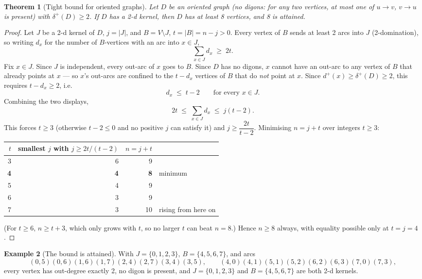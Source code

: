 \documentclass[11pt]{article}
\theoremstyle{plain}
\newtheorem{theorem}{Theorem}
\theoremstyle{definition}
\newtheorem{example}[theorem]{Example}
\theoremstyle{remark}
\begin{document}
\pagestyle{empty}

\begin{theorem}[Tight bound for oriented graphs]
\label{thm:bound}
Let $D$ be an \emph{oriented} graph (no digons: for any two vertices, at most one of
$u\to v$, $v\to u$ is present) with $\delta^+(D) \ge 2$. If $D$ has a 2-d kernel, then
$D$ has at least 8 vertices, and 8 is attained.
\end{theorem}

\begin{proof}
Let $J$ be a 2-d kernel of $D$, $j = |J|$, and $B = V \setminus J$, $t = |B| = n - j > 0$.
Every vertex of $B$ sends at least 2 arcs into $J$ (2-domination), so writing $d_x$
for the number of $B$-vertices with an arc into $x \in J$,
\[
\sum_{x \in J} d_x \;\ge\; 2t.
\]
Fix $x \in J$. Since $J$ is independent, every out-arc of $x$ goes to $B$. Since $D$
has no digons, $x$ cannot have an out-arc to any vertex of $B$ that already points at
$x$ — so $x$'s out-arcs are confined to the $t - d_x$ vertices of $B$ that do
\emph{not} point at $x$. Since $d^+(x) \ge \delta^+(D) \ge 2$, this requires
$t - d_x \ge 2$, i.e.
\[
d_x \;\le\; t-2 \qquad \text{for every } x \in J.
\]
Combining the two displays,
\[
2t \;\le\; \sum_{x\in J} d_x \;\le\; j(t-2).
\]
This forces $t \ge 3$ (otherwise $t-2 \le 0$ and no positive $j$ can satisfy it) and
$j \ge \dfrac{2t}{t-2}$. Minimising $n = j+t$ over integers $t \ge 3$:

\begin{center}
\begin{tabular}{@{}rrrl@{}}
\toprule
$t$ & smallest $j$ with $j \ge 2t/(t-2)$ & $n=j+t$ & \\
\midrule
3 & 6 & 9 & \\
\textbf{4} & \textbf{4} & \textbf{8} & minimum \\
5 & 4 & 9 & \\
6 & 3 & 9 & \\
7 & 3 & 10 & rising from here on \\
\bottomrule
\end{tabular}
\end{center}
(For $t \ge 6$, $n \ge t+3$, which only grows with $t$, so no larger $t$ can beat
$n=8$.) Hence $n \ge 8$ always, with equality possible only at $t=j=4$.
\end{proof}

\begin{example}[The bound is attained]
\label{ex:tight}
With $J = \{0,1,2,3\}$, $B = \{4,5,6,7\}$, and arcs
\[
(0,5)(0,6)(1,6)(1,7)(2,4)(2,7)(3,4)(3,5), \qquad
(4,0)(4,1)(5,1)(5,2)(6,2)(6,3)(7,0)(7,3),
\]
every vertex has out-degree exactly 2, no digon is present, and $J = \{0,1,2,3\}$
and $B = \{4,5,6,7\}$ are both 2-d kernels.
\end{example}
\end{document}
